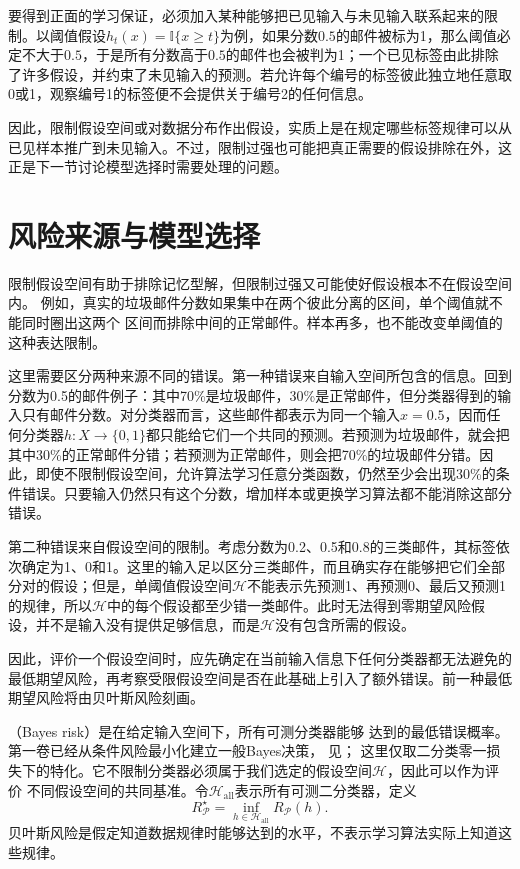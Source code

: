 要得到正面的学习保证，必须加入某种能够把已见输入与未见输入联系起来的限制。以阈值假设$h_t(x)=\mathbb I\{x\geq t\}$为例，如果分数$0.5$的邮件被标为1，那么阈值必定不大于$0.5$，于是所有分数高于$0.5$的邮件也会被判为1；一个已见标签由此排除了许多假设，并约束了未见输入的预测。若允许每个编号的标签彼此独立地任意取0或1，观察编号1的标签便不会提供关于编号2的任何信息。

因此，限制假设空间或对数据分布作出假设，实质上是在规定哪些标签规律可以从已见样本推广到未见输入。不过，限制过强也可能把真正需要的假设排除在外，这正是下一节讨论模型选择时需要处理的问题。

\section{风险来源与模型选择}
\label{sec:statistical-model-selection}

限制假设空间有助于排除记忆型解，但限制过强又可能使好假设根本不在假设空间内。
例如，真实的垃圾邮件分数如果集中在两个彼此分离的区间，单个阈值就不能同时圈出这两个
区间而排除中间的正常邮件。样本再多，也不能改变单阈值的这种表达限制。

这里需要区分两种来源不同的错误。第一种错误来自输入空间所包含的信息。回到分数为0.5的邮件例子：其中70\%是垃圾邮件，30\%是正常邮件，但分类器得到的输入只有邮件分数。对分类器而言，这些邮件都表示为同一个输入$x=0.5$，因而任何分类器$h:X\to\{0,1\}$都只能给它们一个共同的预测。若预测为垃圾邮件，就会把其中30\%的正常邮件分错；若预测为正常邮件，则会把70\%的垃圾邮件分错。因此，即使不限制假设空间，允许算法学习任意分类函数，仍然至少会出现30\%的条件错误。只要输入仍然只有这个分数，增加样本或更换学习算法都不能消除这部分错误。

第二种错误来自假设空间的限制。考虑分数为0.2、0.5和0.8的三类邮件，其标签依次确定为1、0和1。这里的输入足以区分三类邮件，而且确实存在能够把它们全部分对的假设；但是，单阈值假设空间$\mathcal H$不能表示先预测1、再预测0、最后又预测1的规律，所以$\mathcal H$中的每个假设都至少错一类邮件。此时无法得到零期望风险假设，并不是输入没有提供足够信息，而是$\mathcal H$没有包含所需的假设。

因此，评价一个假设空间时，应先确定在当前输入信息下任何分类器都无法避免的最低期望风险，再考察受限假设空间是否在此基础上引入了额外错误。前一种最低期望风险将由贝叶斯风险刻画。

（Bayes risk）是在给定输入空间下，所有可测分类器能够
达到的最低错误概率。第一卷已经从条件风险最小化建立一般Bayes决策，
见；
这里仅取二分类零一损失下的特化。它不限制分类器必须属于我们选定的假设空间$\mathcal H$，因此可以作为评价
不同假设空间的共同基准。令$\mathcal H_{\mathrm{all}}$表示所有可测二分类器，定义
\begin{equation}
 R_{\mathcal P}^\star=\inf_{h\in\mathcal H_{\mathrm{all}}}R_{\mathcal P}(h).
 \label{eq:bayes-risk}
\end{equation}
贝叶斯风险是假定知道数据规律时能够达到的水平，不表示学习算法实际上知道这些规律。

